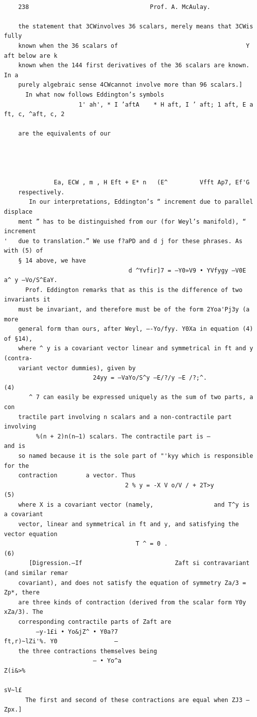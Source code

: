 \documentclass[10pt]{article}
\begin{document}
\begin{verbatim}

    238                                  Prof. A. McAulay.

    the statement that 3CWinvolves 36 scalars, merely means that 3CWis fully
    known when the 36 scalars of                                    Y aft below are k
    known when the 144 first derivatives of the 36 scalars are known. In a
    purely algebraic sense 4CWcannot involve more than 96 scalars.]
      In what now follows Eddington’s symbols
                     1' ah', * I ’aftA    * H aft, I ’ aft; 1 aft, E a ft, c, ^aft, c, 2

    are the equivalents of our




              Ea, ECW , m , H Eft + E* n   (E^         Vfft Ap7, Ef'G
    respectively.
       In our interpretations, Eddington’s “ increment due to parallel displace­
    ment ” has to be distinguished from our (for Weyl’s manifold), “ increment
'   due to translation.” We use f?aPD and d j for these phrases. As with (5) of
    § 14 above, we have
                                   d ^Yvfir]7 = —Y0»V9 • YVfygy —V0E a^ y —Vo/S^EaY.
      Prof. Eddington remarks that as this is the difference of two invariants it
    must be invariant, and therefore must be of the form 2Yoa'Pj3y (a more
    general form than ours, after Weyl, —-Yo/fyy. Y0Xa in equation (4) of §14),
    where ^ y is a covariant vector linear and symmetrical in ft and y (contra-
    variant vector dummies), given by
                         24yy = —VaYo/S^y —E/?/y —E /?;^.                                  (4)
       ^ 7 can easily be expressed uniquely as the sum of two parts, a con­
    tractile part involving n scalars and a non-contractile part involving
         %(n + 2)n(n—1) scalars. The contractile part is —                  and is
    so named because it is the sole part of "'kyy which is responsible for the
    contraction        a vector. Thus
                                  2 % y = -X V o/V / + 2T>y                                (5)
    where X is a covariant vector (namely,                 and T^y is a covariant
    vector, linear and symmetrical in ft and y, and satisfying the vector equation
                                     T ^ = 0 .                                 (6)
       [Digression.—If                          Zaft si contravariant (and similar remar
    covariant), and does not satisfy the equation of symmetry Za/3 = Zp*, there
    are three kinds of contraction (derived from the scalar form Y0y xZa/3). The
    corresponding contractile parts of Zaft are
         —y-1£i • Yo&jZ^ • Y0a?7                              ft,r)~lZi'%. Y0                —
    the three contractions themselves being
                         — • Yo^a                                     Z(i&>%
                                                                           sV~l£
      The first and second of these contractions are equal when ZJ3 — Zpx.]


\end{verbatim}
\end{document}
